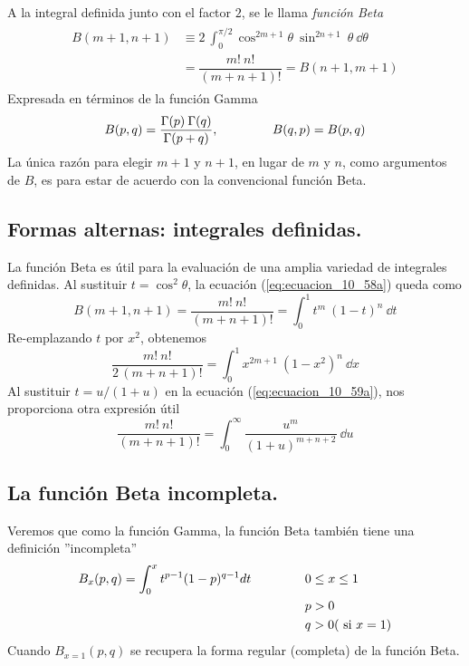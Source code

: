 A la integral definida junto con el factor $2$, se le llama \emph{función Beta}
\begin{align}
\begin{aligned}
B(m+1, n+1) &\equiv 2 \: \int_{0}^{\pi/2} \cos^{2m+1} \theta \: \sin^{2n+1} \: \theta \: \dd \theta \\
&= \dfrac{m! \: n!}{(m+n+1)!} = B(n+1, m+1)
\label{eq:ecuacion_10_58a}
\end{aligned}
\end{align}
Expresada en términos de la función Gamma
\begin{equation}
B(p, q) = \dfrac{\Gamma(p) \: \Gamma(q)}{\Gamma(p+q)}, \hspace{1.5cm} B(q, p) = B(p, q)
\label{eq:ecuacion_10_58b}
\end{equation}
La única razón para elegir $m + 1$ y $n + 1$, en lugar de $m$ y $n$, como argumentos de $B$, es para estar de acuerdo con la convencional función Beta.
\subsection{Formas alternas: integrales definidas.}
La función Beta es útil para la evaluación de una amplia variedad de integrales definidas. Al sustituir $t= \cos^{2} \theta$, la ecuación (\ref{eq:ecuacion_10_58a}) queda como
\begin{equation}
B(m+1, n+1) = \dfrac{m! \: n!}{(m+n+1)!} = \int_{0}^{1} t^{m} \: (1 - t)^{n} \: \dd t
\label{eq:ecuacion_10_59a}
\end{equation}
Re-emplazando $t$ por $x^{2}$, obtenemos
\begin{equation}
\dfrac{m! \: n!}{2 \, (m+n+1)!} = \int_{0}^{1} x^{2m+1} \: (1-x^{2})^{n} \: \dd x
\label{eq:ecuacion_10_59b}
\end{equation}
Al sustituir $t= u/(1+u)$ en la ecuación (\ref{eq:ecuacion_10_59a}), nos proporciona otra expresión útil
\begin{equation}
\dfrac{m! \: n!}{(m+n+1)!} = \int_{0}^{\infty} \dfrac{u^{m}}{(1+u)^{m+n+2}} \: \dd u
\label{eq:ecuacion_10_60}
\end{equation}
\subsection{La función Beta incompleta.}
Veremos que como la función Gamma, la función Beta también tiene una definición ''incompleta''
\begin{eqnarray}
\begin{aligned}
B_{x}(p,q) = \int_{0}^{x} t^{p-1} (1-p)^{q-1} dt \hspace{1.5cm} & 0 \leq x \leq 1 \\
& p > 0 \\
& q > 0 (\text{ si } x=1)
\label{eq:ecuacion_10_67}
\end{aligned}
\end{eqnarray}
Cuando $B_{x=1}(p,q)$ se recupera la forma regular (completa) de la función Beta.
